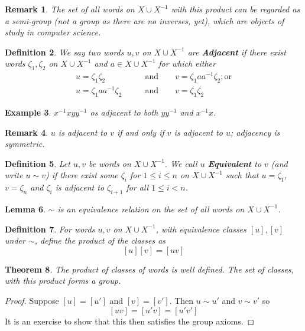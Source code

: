 \documentclass[a4paper,10pt]{article}
\newtheorem{thm}{Theorem}
\newtheorem{Def}[thm]{Definition}
\newtheorem{eg}[thm]{Example}
\newtheorem{Lem}[thm]{Lemma}
\newtheorem{rem}[thm]{Remark}
\begin{document}
\begin{rem}
The set of all words on $X \cup X^{-1}$ with this product can be regarded as a semi-group (not a group as there are no inverses, yet), which are objects of study in computer science. 
\end{rem}

\begin{Def}
We say two words $u,v$ on $X \cup X^{-1}$ are \textbf{Adjacent} if there exist words $\zeta_1, \zeta_2$ on $X \cup X^{-1}$ and $a \in X \cup X^{-1}$ for which either
\begin{align}
u = \zeta_1 \zeta_2 \qquad &\text{and} \qquad v = \zeta_1 a a^{-1} \zeta_2; \text{or} \\
u = \zeta_1 a a^{-1} \zeta_2 \qquad &\text{and} \qquad v = \zeta_1 \zeta_2 
\end{align}
\end{Def}

\begin{eg}
$x^{-1} x y y^{-1}$ os adjacent to both $yy^{-1}$ and $x^{-1} x$.
\end{eg}

\begin{rem}
$u$ is adjacent to $v$ if and only if $v$ is adjacent to $u$; adjacency is symmetric.  
\end{rem}

\begin{Def}
Let $u,v$ be words on $X \cup X^{-1}$. We call $u$ \textbf{Equivalent} to $v$ (and write $u \sim v$) if there exist some $\zeta_i$ for $1 \leq i \leq n$ on $X \cup X^{-1}$ such that $u = \zeta_1$, $v = \zeta_n$ and $\zeta_i$ is adjacent to $\zeta_{i+1}$ for all $1 \leq i < n$. 
\end{Def}

\begin{Lem}
$\sim$ is an equivalence relation on the set of all words on $X \cup X^{-1}$.
\end{Lem}

\begin{Def}
For words $u, v$ on $X \cup X^{-1}$, with equivalence classes $[u], [v]$ under $\sim$,  define the product of the classes as
\[ [u] [v] = [uv] \]
\end{Def}

\begin{thm}
The product of classes of words is well defined. The set of classes, with this product forms a group. 
\end{thm}

\begin{proof}
Suppose $[u] = [u']$ and $[v] = [v']$. Then $u \sim u'$ and $v \sim v'$ so 
\[ [uv] = [u'v] = [u'v'] \]
It is an exercise to show that this then satisfies the group axioms.
\end{proof}
\end{document}

